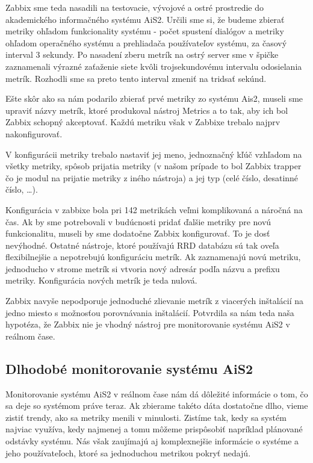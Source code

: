 \documentclass[a4paper, usesections, upjsfrontpage, thesismargins, thesislinespacing]{rnthesis}
\begin{document}
Zabbix sme teda nasadili na testovacie, vývojové a ostré prostredie do akademického informačného systému AiS2.
Určili sme si, že budeme zbierať metriky ohľadom funkcionality systému - počet spustení dialógov a metriky ohľadom operačného systému a prehliadača používateľov systému, za časový interval 3 sekundy.
Po nasadení zberu metrík na ostrý server sme v špičke zaznamenali výrazné zaťaženie siete kvôli trojsekundovému intervalu odosielania metrík.
Rozhodli sme sa preto tento interval zmeniť na tridsať sekúnd.

Ešte skôr ako sa nám podarilo zbierať prvé metriky zo systému Ais2, 
	museli sme upraviť názvy metrík, ktoré produkoval nástroj Metrics a to tak, aby ich bol Zabbix schopný akceptovať.
Každú metriku však v Zabbixe trebalo najprv nakonfigurovať.

V konfigurácii metriky trebalo nastaviť jej meno, 
	jednoznačný kľúč vzhľadom na všetky metriky, 
	spôsob prijatia metriky (v našom prípade to bol Zabbix trapper čo je modul na prijatie metriky z iného nástroja) a jej typ (celé číslo, desatinné číslo, \ldots).

Konfigurácia v zabbixe bola pri 142 metrikách veľmi komplikovaná a náročná na čas.
Ak by sme potrebovali v budúcnosti pridať ďalšie metriky pre novú funkcionalitu, museli by sme dodatočne Zabbix konfigurovať.
To je dosť nevýhodné.
Ostatné nástroje, ktoré používajú RRD databázu sú tak oveľa flexibilnejšie a nepotrebujú konfiguráciu metrík.
Ak zaznamenajú novú metriku, jednoducho v strome metrík si vtvoria nový adresár podľa názvu a prefixu metriky.
Konfigurácia nových metrík je teda nulová.

Zabbix navyše nepodporuje jednoduché zlievanie metrík z viacerých inštalácií na jedno miesto s možnosťou porovnávania inštalácií.
Potvrdila sa nám teda naša hypotéza, že Zabbix nie je vhodný nástroj pre monitorovanie systému AiS2 v reálnom čase.

\subsection{Dlhodobé monitorovanie systému AiS2}

Monitorovanie systému AiS2 v reálnom čase nám dá dôležité informácie o tom, čo sa deje so systémom práve teraz.
Ak zbierame takéto dáta dostatočne dlho, vieme zistiť trendy, ako sa metriky menili v minulosti.
Zistíme tak, kedy sa systém najviac využíva, kedy najmenej a tomu môžeme prispôsobiť napríklad plánované odstávky systému.
Nás však zaujímajú aj komplexnejšie informácie o systéme a jeho používateľoch, ktoré sa jednoduchou metrikou pokryť nedajú.
\end{document}
